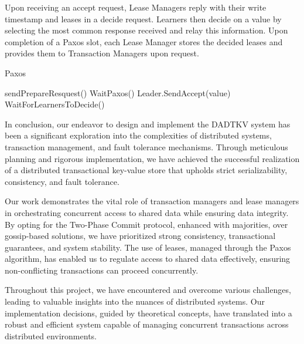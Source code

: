 \documentclass[times, 10pt,twocolumn]{article}
\begin{document}
Upon receiving an accept request, Lease Managers reply with their 
write timestamp and leases in a decide request. Learners then decide 
on a value by selecting the most common response received and relay 
this information. Upon completion of a Paxos slot, each Lease Manager 
stores the decided leases and provides them to Transaction Managers 
upon request.

\begin{algorithm}
\caption{Paxos}
    \begin{algorithmic}
                \State sendPrepareResquest()
            \EndIf
                    \State WaitPaxos()
                \EndIf
            \EndFor
            \State Leader.SendAccept(value)
            \State WaitForLearnersToDecide()
        \EndFunction
    \end{algorithmic}
\end{algorithm}


In conclusion, our endeavor to design and implement the DADTKV 
system has been a significant exploration into the complexities 
of distributed systems, transaction management, and fault tolerance 
mechanisms. Through meticulous planning and rigorous implementation, 
we have achieved the successful realization of a distributed transactional 
key-value store that upholds strict serializability, consistency, and 
fault tolerance.

Our work demonstrates the vital role of transaction managers and 
lease managers in orchestrating concurrent access to shared data 
while ensuring data integrity. By opting for the Two-Phase Commit 
protocol, enhanced with majorities, over gossip-based solutions, 
we have prioritized strong consistency, transactional guarantees, 
and system stability. The use of leases, managed through the Paxos 
algorithm, has enabled us to regulate access to shared data effectively, 
ensuring non-conflicting transactions can proceed concurrently.

Throughout this project, we have encountered and overcome various 
challenges, leading to valuable insights into the nuances of 
distributed systems. Our implementation decisions, guided by theoretical 
concepts, have translated into a robust and efficient system capable 
of managing concurrent transactions across distributed environments.

\nocite{ex1, ex2}


\end{document}
